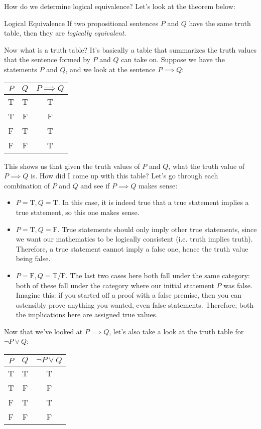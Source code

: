 How do we determine logical equivalence? Let's look at the theorem below:
\begin{theorem}{Logical Equivalence}{}
	If two propositional sentences \( P \) and \( Q \) have the same truth table, then they are \textit{logically equivalent}.
\end{theorem}
Now what is a truth table? It's basically a table that summarizes the truth values that the sentence formed by 
\( P \) and \( Q \) can take on. Suppose we have the statements \( P \) and \( Q \), and we look at the 
sentence \( P \implies Q \):
\begin{center}
	\begin{tabular}{c|c|c}
		\( P \) & \( Q \) & \( P \implies Q \) \\
		\hline
		T & T & T\\
		T & F & F\\
		F & T & T\\
		F & F & T
	\end{tabular}
\end{center}
This shows us that given the truth values of \( P \) and \( Q \), what the truth value of \( P \implies Q  \) is. 
How did I come up with this table? Let's go through each combination of \( P \) and \( Q \) and see if 
\( P \implies Q \) makes sense:
\begin{itemize}
	\item \( P = \text{T}, Q = \text{T} \). In this case, it is indeed true that a true statement implies a true 
		statement, so this one makes sense. 
	\item \( P = \text{T}, Q = \text{F} \). True statements should only imply other true statements, since we 
		want our mathematics to be logically consistent (i.e. truth implies truth). Therefore, a true statement cannot 
		imply a false one, hence the truth value being false. 
	\item \( P = \text{F}, Q = \text{T/F} \). The last two cases here both fall under the same category: 
		both of these fall under the 
		category where our initial statement \( P \) was false. Imagine this: if you started off a proof with a 
		false premise, then you can ostensibly prove anything you wanted, even false statements. Therefore, 
		both the implications here are assigned true values. 
\end{itemize}
Now that we've looked at \( P \implies Q \), let's also take a look at the truth table for \( \neg P \lor Q \):
\begin{center}
	\begin{tabular}{c|c|c}
		\( P \) & \( Q \) & \( \neg P \lor Q \) \\
		\hline
		T & T & T\\
		T & F & F\\
		F & T & T\\
		F & F & F
	\end{tabular}
\end{center}
